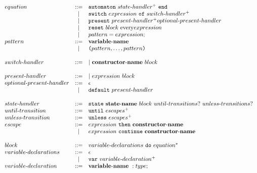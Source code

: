 \documentclass[a4paper]{article}
\newcommand{\Coloneqq}[0]{::=}
\begin{document}
\newcommand{\funo}{fun\sdash{}or\sdash{}node}

\[
\begin{array}{lcl}
  equation & \Coloneqq &
    \mathtt{automaton} \ state\sdash{}handler^+ \ \mathtt{end} \\
  & | & \mathtt{switch} \ expression \ \mathtt{of} \ switch\sdash{}handler^+ \\
  & | & \mathtt{present} \ present\sdash{}handler^+
    optional\sdash{}present\sdash{}handler \\
  & | & \mathtt{reset} \ block \ \mathrm{every} expression \\
  & | & pattern = expression; \\
  pattern & \Coloneqq & {\bf variable\sdash{}name} \\
  & | & \lp{}pattern,\dots,pattern\rp{} \\

  \\

  switch\sdash{}handler &
    \Coloneqq & | \ {\bf constructor\sdash{}name} \ block \\

  \\

  present\sdash{}handler & \Coloneqq &
    | \ expression \  block \\
  optional\sdash{}present\sdash{}handler & \Coloneqq & \epsilon \\
  & | & \mathtt{default} \ present\sdash{}handler \\

  \\
  state\sdash{}handler & \Coloneqq &
    \mathtt{state} \  {\bf state\sdash{}name} \ block
    \ until\sdash{}transitions? \  unless\sdash{}transitions? \\
  until\sdash{}transition & \Coloneqq & \mathtt{until} \ escapes^+ \\
  unless\sdash{}transition & \Coloneqq & \mathtt{unless} \ escapes^+ \\
  escape & \Coloneqq &
    expression \ \mathtt{then} \ {\bf constructor\sdash{}name} \\
    & | & expression \ \mathtt{continue} \ {\bf constructor\sdash{}name} \\

  \\

  block & \Coloneqq & variable\sdash{}declarations \ \mathtt{do} \ equation^* \\
  variable\sdash{}declarations & \Coloneqq & \epsilon \\
  & | & \mathtt{var} \ variable\sdash{}declaration^+ \\
  variable\sdash{}declaration & \Coloneqq & {\bf variable\sdash{}name} \ : type;
    \\


\end{array}\]
\end{document}
